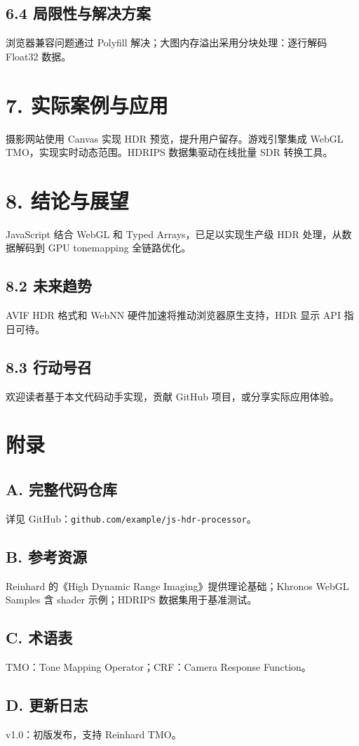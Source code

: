 \section{6.4 局限性与解决方案}
浏览器兼容问题通过 Polyfill 解决；大图内存溢出采用分块处理：逐行解码 Float32 数据。\par
\chapter{7. 实际案例与应用}
摄影网站使用 Canvas 实现 HDR 预览，提升用户留存。游戏引擎集成 WebGL TMO，实现实时动态范围。HDRIPS 数据集驱动在线批量 SDR 转换工具。\par
\chapter{8. 结论与展望}
JavaScript 结合 WebGL 和 Typed Arrays，已足以实现生产级 HDR 处理，从数据解码到 GPU tonemapping 全链路优化。\par
\section{8.2 未来趋势}
AVIF HDR 格式和 WebNN 硬件加速将推动浏览器原生支持，HDR 显示 API 指日可待。\par
\section{8.3 行动号召}
欢迎读者基于本文代码动手实现，贡献 GitHub 项目，或分享实际应用体验。\par
\chapter{附录}
\section{A. 完整代码仓库}
详见 GitHub：\texttt{github.com/example/js-hdr-processor}。\par
\section{B. 参考资源}
Reinhard 的《High Dynamic Range Imaging》提供理论基础；Khronos WebGL Samples 含 shader 示例；HDRIPS 数据集用于基准测试。\par
\section{C. 术语表}
TMO：Tone Mapping Operator；CRF：Camera Response Function。\par
\section{D. 更新日志}
v1.0：初版发布，支持 Reinhard TMO。\par
